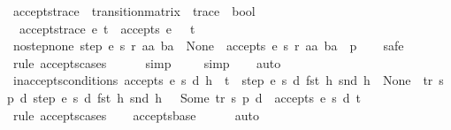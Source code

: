 \begin{isabellebody}
\isanewline
{}\isamarkupfalse%
\ accepts{\isacharunderscore}trace\ {\isacharcolon}{\isacharcolon}\ {\isachardoublequoteopen}transition{\isacharunderscore}matrix\ {\isasymRightarrow}\ trace\ {\isasymRightarrow}\ bool{\isachardoublequoteclose}\ \isanewline
\ \ {\isachardoublequoteopen}accepts{\isacharunderscore}trace\ e\ t\ {\isasymequiv}\ accepts\ e\ {}\ {\isacharless}{\isachargreater}\ t{\isachardoublequoteclose}\isanewline
\isanewline
{}\isamarkupfalse%
\ no{\isacharunderscore}step{\isacharunderscore}none{\isacharcolon}\ {\isachardoublequoteopen}step\ e\ s\ r\ aa\ ba\ {\isacharequal}\ None\ {\isasymLongrightarrow}\ {\isasymnot}accepts\ e\ s\ r\ {\isacharparenleft}{\isacharparenleft}aa{\isacharcomma}\ ba{\isacharparenright}\ {\isacharhash}\ p{\isacharparenright}{\isachardoublequoteclose}\isanewline
%
\isadelimproof
\ \ %
\endisadelimproof
%
\isatagproof
{}\isamarkupfalse%
\ safe\isanewline
\ \ \isamarkupfalse%
\ {\isacharparenleft}rule\ accepts{\isachardot}cases{\isacharparenright}\isanewline
\ \ \ \ \isamarkupfalse%
\ simp\isanewline
\ \ \ \isamarkupfalse%
\ simp\isanewline
\ \ \isamarkupfalse%
\ auto%
\endisatagproof
{\isafoldproof}%
%
\isadelimproof
\isanewline
%
\endisadelimproof
\isanewline
{}\isamarkupfalse%
\ inaccepts{\isacharunderscore}conditions{\isacharcolon}\ {\isachardoublequoteopen}{\isasymnot}accepts\ e\ s\ d\ {\isacharparenleft}h\ {\isacharhash}\ t{\isacharparenright}\ {\isasymLongrightarrow}\ step\ e\ s\ d\ {\isacharparenleft}fst\ h{\isacharparenright}\ {\isacharparenleft}snd\ h{\isacharparenright}\ {\isacharequal}\ None\ {\isasymor}\ {\isacharparenleft}{\isasymexists}tr\ s{\isacharprime}\ p{\isacharprime}\ d{\isacharprime}{\isachardot}\ step\ e\ s\ d\ {\isacharparenleft}fst\ h{\isacharparenright}\ {\isacharparenleft}snd\ h{\isacharparenright}\ {\isacharequal}\ \ Some\ {\isacharparenleft}tr{\isacharcomma}\ s{\isacharprime}{\isacharcomma}\ p{\isacharprime}{\isacharcomma}\ d{\isacharprime}{\isacharparenright}\ {\isasymand}\ {\isasymnot}accepts\ e\ s{\isacharprime}\ d{\isacharprime}\ t{\isacharparenright}{\isachardoublequoteclose}\isanewline
%
\isadelimproof
\ \ %
\endisadelimproof
%
\isatagproof
{}\isamarkupfalse%
\ {\isacharparenleft}rule\ accepts{\isachardot}cases{\isacharparenright}\isanewline
\ \ \isamarkupfalse%
\ accepts{\isachardot}base\isanewline
\ \ \ \ \isamarkupfalse%
\ auto{\isacharbrackleft}{}{\isacharbrackright}\isanewline

\end{isabellebody}
